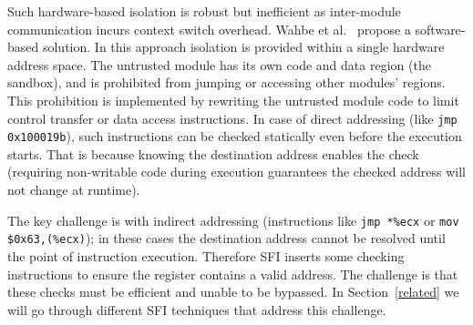 \documentclass[conference]{IEEEtran}
\begin{document}
Such hardware-based  isolation is robust but inefficient as inter-module communication incurs context switch overhead. 
Wahbe et al.~\cite{wahbeSFI}  propose a software-based solution. In this approach isolation is provided within a single hardware address space. 
The untrusted module has its own code and data region (the sandbox), and is prohibited from jumping or accessing other modules' regions.
This prohibition is implemented by rewriting the untrusted module code to limit  control transfer or data access instructions. In case of direct addressing (like  \texttt{jmp  0x100019b}), such instructions can be checked statically even before the execution starts. That is because knowing the destination address enables the check (requiring non-writable code during execution guarantees the checked address will not change at runtime).

The key challenge is with indirect addressing (instructions like \texttt{jmp~*\%ecx} or \texttt{mov \$0x63,(\%ecx)}); in these cases the destination address cannot be resolved until the point of instruction execution. Therefore SFI inserts some checking instructions to ensure the register contains a valid address. The challenge is that these checks must be efficient and unable to be bypassed. In Section~\ref{related} we will go through different SFI techniques that address this challenge.
\end{document}
